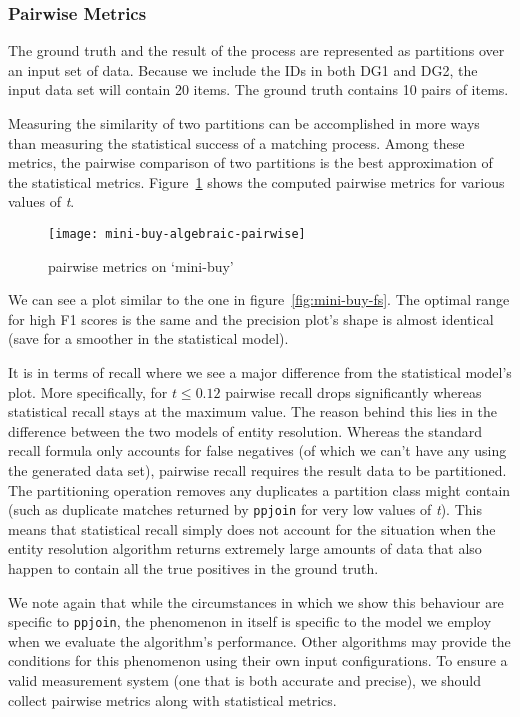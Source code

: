 \subsubsection{Pairwise Metrics}

The ground truth and the result of the process are represented as partitions
over an input set of data.
Because we include the IDs in both DG1 and DG2, the input data set will
contain 20 items.
The ground truth contains 10 pairs of items.

Measuring the similarity of two partitions can be accomplished in more ways than
measuring the statistical success of a matching process.
Among these metrics, the pairwise comparison of two partitions is the best
approximation of the statistical metrics\cite{Men10}.
Figure~\ref{fig:mini-alg-pairwise} shows the computed pairwise metrics for
various values of \textit{t}.

\begin{figure}[!h]
    \centering
    \captionsetup{justification=centering}
    \texttt{[image: mini-buy-algebraic-pairwise]}
    \caption{pairwise metrics on `mini-buy'}
    \label{fig:mini-alg-pairwise}
\end{figure}

We can see a plot similar to the one in figure~\ref{fig:mini-buy-fs}.
The optimal range for high F1 scores is the same and the precision plot's shape
is almost identical (save for a smoother in the statistical model).

It is in terms of recall where we see a major difference from the statistical
model's plot.
More specifically, for $t \le 0.12$ pairwise recall drops significantly whereas
statistical recall stays at the maximum value.
The reason behind this lies in the difference between the two models of entity
resolution.
Whereas the standard recall formula only accounts for false negatives (of which
we can't have any using the generated data set), pairwise recall requires the
result data to be partitioned.
The partitioning operation removes any duplicates a partition class might
contain (such as duplicate matches returned by \texttt{ppjoin} for very low
values of \textit{t}).
This means that statistical recall simply does not account for the situation
when the entity resolution algorithm returns extremely large amounts of data
that also happen to contain all the true positives in the ground truth.

We note again that while the circumstances in which we show this behaviour are
specific to \texttt{ppjoin}, the phenomenon in itself is specific to the model
we employ when we evaluate the algorithm's performance.
Other algorithms may provide the conditions for this phenomenon using their own
input configurations.
To ensure a valid measurement system (one that is both accurate and precise), we
should collect pairwise metrics along with statistical metrics.


